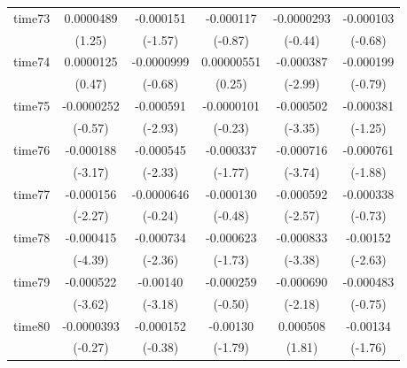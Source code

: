 \begin{table}[htbp]
\begin{tabular}{l*{5}{c}}
time73      &   0.0000489         &   -0.000151         &   -0.000117         &  -0.0000293         &   -0.000103         \\
            &      (1.25)         &     (-1.57)         &     (-0.87)         &     (-0.44)         &     (-0.68)         \\
time74      &   0.0000125         &  -0.0000999         &  0.00000551         &   -0.000387\sym{**} &   -0.000199         \\
            &      (0.47)         &     (-0.68)         &      (0.25)         &     (-2.99)         &     (-0.79)         \\
time75      &  -0.0000252         &   -0.000591\sym{**} &  -0.0000101         &   -0.000502\sym{***}&   -0.000381         \\
            &     (-0.57)         &     (-2.93)         &     (-0.23)         &     (-3.35)         &     (-1.25)         \\
time76      &   -0.000188\sym{**} &   -0.000545\sym{*}  &   -0.000337         &   -0.000716\sym{***}&   -0.000761         \\
            &     (-3.17)         &     (-2.33)         &     (-1.77)         &     (-3.74)         &     (-1.88)         \\
time77      &   -0.000156\sym{*}  &  -0.0000646         &   -0.000130         &   -0.000592\sym{*}  &   -0.000338         \\
            &     (-2.27)         &     (-0.24)         &     (-0.48)         &     (-2.57)         &     (-0.73)         \\
time78      &   -0.000415\sym{***}&   -0.000734\sym{*}  &   -0.000623         &   -0.000833\sym{***}&    -0.00152\sym{**} \\
            &     (-4.39)         &     (-2.36)         &     (-1.73)         &     (-3.38)         &     (-2.63)         \\
time79      &   -0.000522\sym{***}&    -0.00140\sym{**} &   -0.000259         &   -0.000690\sym{*}  &   -0.000483         \\
            &     (-3.62)         &     (-3.18)         &     (-0.50)         &     (-2.18)         &     (-0.75)         \\
time80      &  -0.0000393         &   -0.000152         &    -0.00130         &    0.000508         &    -0.00134         \\
            &     (-0.27)         &     (-0.38)         &     (-1.79)         &      (1.81)         &     (-1.76)         \\

\end{tabular}
\end{table}
